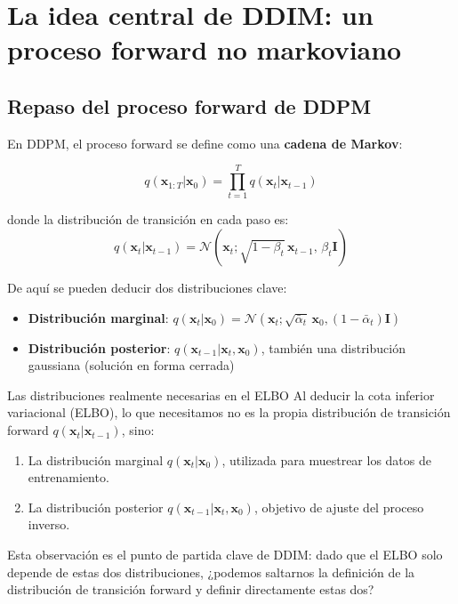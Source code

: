 \section{La idea central de DDIM: un proceso forward no markoviano}

\subsection{Repaso del proceso forward de DDPM}

En DDPM, el proceso forward se define como una \textbf{cadena de Markov}:

$$
q(\mathbf{x}_{1:T} | \mathbf{x}_0) = \prod_{t=1}^{T} q(\mathbf{x}_t | \mathbf{x}_{t-1})
$$

donde la distribución de transición en cada paso es:
$$
q(\mathbf{x}_t | \mathbf{x}_{t-1}) = \mathcal{N}(\mathbf{x}_t; \sqrt{1-\beta_t}\,\mathbf{x}_{t-1},\, \beta_t \mathbf{I})
$$

De aquí se pueden deducir dos distribuciones clave:
\begin{itemize}
    \item \textbf{Distribución marginal}: $q(\mathbf{x}_t | \mathbf{x}_0) = \mathcal{N}(\mathbf{x}_t; \sqrt{\bar{\alpha}_t}\,\mathbf{x}_0, (1-\bar{\alpha}_t)\mathbf{I})$
    \item \textbf{Distribución posterior}: $q(\mathbf{x}_{t-1} | \mathbf{x}_t, \mathbf{x}_0)$, también una distribución gaussiana (solución en forma cerrada)
\end{itemize}

\begin{importantbox}{Las distribuciones realmente necesarias en el ELBO}
Al deducir la cota inferior variacional (ELBO), lo que necesitamos no es la propia distribución de transición forward $q(\mathbf{x}_t|\mathbf{x}_{t-1})$, sino:
\begin{enumerate}
    \item La distribución marginal $q(\mathbf{x}_t | \mathbf{x}_0)$, utilizada para muestrear los datos de entrenamiento.
    \item La distribución posterior $q(\mathbf{x}_{t-1} | \mathbf{x}_t, \mathbf{x}_0)$, objetivo de ajuste del proceso inverso.
\end{enumerate}
Esta observación es el punto de partida clave de DDIM: dado que el ELBO solo depende de estas dos distribuciones, ¿podemos saltarnos la definición de la distribución de transición forward y definir directamente estas dos?
\end{importantbox}

